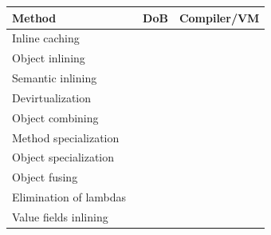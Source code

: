 
\begin{tabularx}{\linewidth}{>{\raggedright}Xll}
\toprule
Method
  & DoB
  & Compiler/VM
  \\
\midrule
Inline caching~\citep{deutsch1984efficient}
  & \citeyear{deutsch1984efficient}
  &
  \\
Object inlining~\citep{dolby1997automatic,budimlic1997optimizing,dolby2000automatic,wimmer2007automatic}
  & \citeyear{dolby1997automatic}
  &
  \\
Semantic inlining~\citep{wu1998improving}
  & \citeyear{wu1998improving}
  &
  \\
Devirtualization~\citep{ishizaki2000study}
  & \citeyear{ishizaki2000study}
  &
  \\
Object combining~\citep{veldema2002object}
  & \citeyear{veldema2002object}
  &
  \\
Method specialization~\citep{schultz2003automatic}
  & \citeyear{schultz2003automatic}
  &
  \\
Object specialization~\citep{andersen2004declarative,vasileva2023object}
  & \citeyear{andersen2004declarative}
  &
  \\
Object fusing~\citep{wimmer2010automatic}
  & \citeyear{wimmer2010automatic}
  &
  \\
Elimination of lambdas~\citep{moller2020eliminating}
  & \citeyear{moller2020eliminating}
  &
  \\
Value fields inlining~\citep{bruno2021compiler}
  & \citeyear{bruno2021compiler}
  &
  \\
\bottomrule
\end{tabularx}
